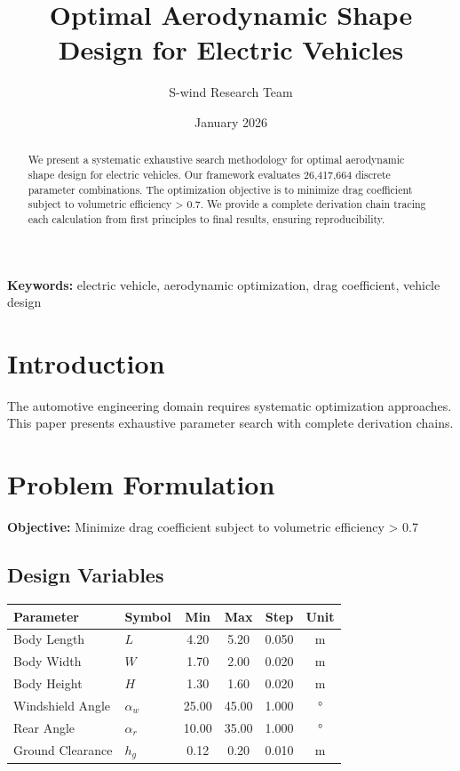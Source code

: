 \documentclass[11pt,a4paper]{article}
\title{Optimal Aerodynamic Shape Design for Electric Vehicles}
\author{S-wind Research Team}
\date{January 2026}
\begin{document}
\maketitle

\begin{abstract}
We present a systematic exhaustive search methodology for optimal aerodynamic shape design for electric vehicles. Our framework evaluates 26,417,664 discrete parameter combinations. The optimization objective is to minimize drag coefficient subject to volumetric efficiency > 0.7. We provide a complete derivation chain tracing each calculation from first principles to final results, ensuring reproducibility.
\end{abstract}

\textbf{Keywords:} electric vehicle, aerodynamic optimization, drag coefficient, vehicle design

\section{Introduction}

The automotive engineering domain requires systematic optimization approaches. This paper presents exhaustive parameter search with complete derivation chains.

\section{Problem Formulation}

\textbf{Objective:} Minimize drag coefficient subject to volumetric efficiency > 0.7

\subsection{Design Variables}

\begin{center}
\begin{tabular}{llcccc}
\hline
Parameter & Symbol & Min & Max & Step & Unit \\
\hline
Body Length & $L$ & 4.20 & 5.20 & 0.050 & m \\
Body Width & $W$ & 1.70 & 2.00 & 0.020 & m \\
Body Height & $H$ & 1.30 & 1.60 & 0.020 & m \\
Windshield Angle & $α_w$ & 25.00 & 45.00 & 1.000 & ° \\
Rear Angle & $α_r$ & 10.00 & 35.00 & 1.000 & ° \\
Ground Clearance & $h_g$ & 0.12 & 0.20 & 0.010 & m \\
\hline
\end{tabular}
\end{center}
\end{document}
